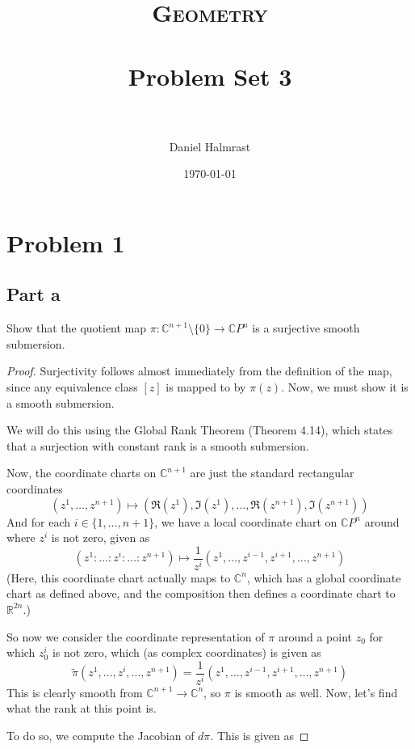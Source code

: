 \documentclass[fontsize=11pt]{scrartcl} %
\title{	
\normalfont \normalsize 
\textsc{Geometry} \\ [25pt] %
\horrule{0.5pt} \\[0.4cm] %
\huge Problem Set 3\\ %
\horrule{2pt} \\[0.5cm] %
}
\author{Daniel Halmrast} %
\date{\normalsize\today} %
\numberwithin{equation}{section} %
\numberwithin{figure}{section} %
\numberwithin{table}{section} %
\newcommand{\R}{\mathbb{R}}
\newcommand{\C}{\mathbb{C}}
\begin{document}
\maketitle %

\section*{Problem 1} %
\subsection*{Part a}
Show that the quotient map $\pi: \C^{n+1}\setminus \{0\}\to\C P^n$ is a surjective
smooth submersion.
\\
\begin{proof}
Surjectivity follows almost immediately from the definition of the map, since any
equivalence class $[z]$ is mapped to by $\pi(z)$. Now, we must show it is a smooth submersion.

We will do this using the Global Rank Theorem (Theorem 4.14), which states that a surjection
with constant rank is a smooth submersion.

Now, the coordinate charts on $\C^{n+1}$ are just the standard rectangular coordinates
\[
(z^1,\ldots,z^{n+1}) \mapsto (\Re(z^1),\Im(z^1),\ldots,\Re(z^{n+1}),\Im(z^{n+1}))
\]
And for each $i\in\{1,\ldots,n+1\}$, we have a local coordinate chart on $\C P^n$ around
where $z^i$ is not zero, given as
\[
(z^1:\ldots:z^i:\ldots:z^{n+1}) \mapsto \frac{1}{z^i}(z^1,\ldots,z^{i-1},z^{i+1},\ldots,z^{n+1})
\]
(Here, this coordinate chart actually maps to $\C^n$, which has a global coordinate chart
as defined above, and the composition then defines a coordinate chart to $\R^{2n}$.)

So now we consider the coordinate representation of $\pi$ around a point $z_0$ for which
$z_0^i$ is not zero, which (as complex coordinates) is given as
\[
\tilde{\pi}(z^1,\ldots,z^i,\ldots,z^{n+1}) = \frac{1}{z^i}(z^1,\ldots,z^{i-1},z^{i+1},\ldots,z^{n+1})
\]
This is clearly smooth from $\C^{n+1}\to\C^n$, so $\pi$ is smooth as well.
Now, let's find what the rank at this point is.

To do so, we compute the Jacobian of $d\pi$. This is given as 

\end{proof}
\end{document}
